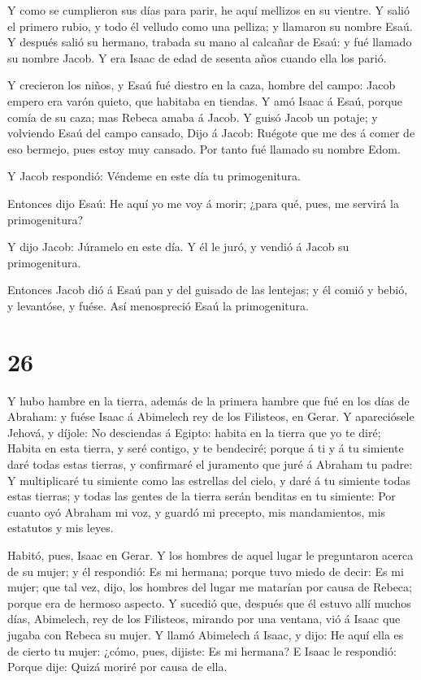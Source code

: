  Y como se cumplieron sus días para parir, he aquí mellizos
en su vientre.  Y salió el primero rubio, y todo él velludo
como una pelliza; y llamaron su nombre Esaú.  Y después
salió su hermano, trabada su mano al calcañar de Esaú: y fué llamado su
nombre Jacob. Y era Isaac de edad de sesenta años cuando ella los parió.

 Y crecieron los niños, y Esaú fué diestro en la caza,
hombre del campo: Jacob empero era varón quieto, que habitaba en
tiendas.  Y amó Isaac á Esaú, porque comía de su caza; mas
Rebeca amaba á Jacob.  Y guisó Jacob un potaje; y volviendo
Esaú del campo cansado,  Dijo á Jacob: Ruégote que me des á
comer de eso bermejo, pues estoy muy cansado. Por tanto fué llamado su
nombre Edom.

 Y Jacob respondió: Véndeme en este día tu primogenitura.

 Entonces dijo Esaú: He aquí yo me voy á morir; ¿para qué,
pues, me servirá la primogenitura?

 Y dijo Jacob: Júramelo en este día. Y él le juró, y vendió
á Jacob su primogenitura.

 Entonces Jacob dió á Esaú pan y del guisado de las
lentejas; y él comió y bebió, y levantóse, y fuése. Así menospreció Esaú
la primogenitura.

\hypertarget{section-25}{%
\section{26}\label{section-25}}

 Y hubo hambre en la tierra, además de la primera hambre que
fué en los días de Abraham: y fuése Isaac á Abimelech rey de los
Filisteos, en Gerar.  Y apareciósele Jehová, y díjole: No
desciendas á Egipto: habita en la tierra que yo te diré; 
Habita en esta tierra, y seré contigo, y te bendeciré; porque á ti y á
tu simiente daré todas estas tierras, y confirmaré el juramento que juré
á Abraham tu padre:  Y multiplicaré tu simiente como las
estrellas del cielo, y daré á tu simiente todas estas tierras; y todas
las gentes de la tierra serán benditas en tu simiente:  Por
cuanto oyó Abraham mi voz, y guardó mi precepto, mis mandamientos, mis
estatutos y mis leyes.

 Habitó, pues, Isaac en Gerar.  Y los hombres de
aquel lugar le preguntaron acerca de su mujer; y él respondió: Es mi
hermana; porque tuvo miedo de decir: Es mi mujer; que tal vez, dijo, los
hombres del lugar me matarían por causa de Rebeca; porque era de hermoso
aspecto.  Y sucedió que, después que él estuvo allí muchos
días, Abimelech, rey de los Filisteos, mirando por una ventana, vió á
Isaac que jugaba con Rebeca su mujer.  Y llamó Abimelech á
Isaac, y dijo: He aquí ella es de cierto tu mujer: ¿cómo, pues, dijiste:
Es mi hermana? E Isaac le respondió: Porque dije: Quizá moriré por causa
de ella.

